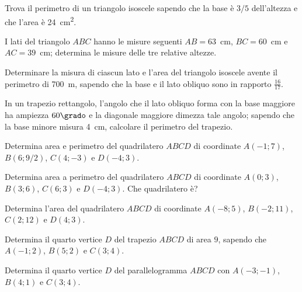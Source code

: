 \begin{multicols}{2}
\begin{esercizio}
\label{ese:7.81}
Trova il perimetro di un triangolo isoscele sapendo che la base è 
$3/5$ dell'altezza e che l'area è 24~cm\textsuperscript{2}.
\end{esercizio}

\begin{esercizio}
\label{ese:7.82}
I lati del triangolo $ABC$ hanno le misure seguenti $AB=63$~cm, 
$BC=60$~cm e $AC=39$~cm; determina le misure delle tre relative 
altezze.
\end{esercizio}

\begin{esercizio}
\label{ese:7.83}
Determinare la misura di ciascun lato e l'area del triangolo isoscele 
avente il perimetro di 700~m, sapendo che la base e il lato obliquo 
sono in rapporto $\frac{16}{17}$.
\end{esercizio}

\begin{esercizio}
\label{ese:7.87}
In un trapezio rettangolo, l'angolo che il lato obliquo forma con la 
base maggiore ha ampiezza $60\grado$ e la diagonale maggiore dimezza 
tale angolo; sapendo che la base minore misura 4~cm,  calcolare il 
perimetro del trapezio.
\end{esercizio}

\begin{esercizio}
\label{ese:7.91}
Determina area e perimetro del quadrilatero $ABCD$ di coordinate 
$A(-1;7)$, $B(6;9/2)$, $C(4;-3)$ e $D(-4;3)$.
\end{esercizio}

\begin{esercizio}
\label{ese:7.92}
Determina area a perimetro del quadrilatero $ABCD$ di coordinate 
$A(0;3)$, $B(3;6)$, $C(6;3)$ e $D(-4;3)$. Che quadrilatero è?
\end{esercizio}

\begin{esercizio}
\label{ese:7.93}
Determina l'area del quadrilatero $ABCD$ di coordinate $A(-8;5)$, 
$B(-2;11)$, $C(2;12)$ e $D(4;3)$.
\end{esercizio}

\begin{esercizio}
\label{ese:7.94}
Determina il quarto vertice $D$ del trapezio $ABCD$ di area $9$, 
sapendo che $A(-1;2)$, $B(5;2)$ e $C(3;4)$.
\end{esercizio}

\begin{esercizio}
\label{ese:7.95}
Determina il quarto vertice $D$ del parallelogramma $ABCD$ con 
$A(-3;-1)$, $B(4;1)$ e $C(3;4)$.
\end{esercizio}


\end{multicols}

